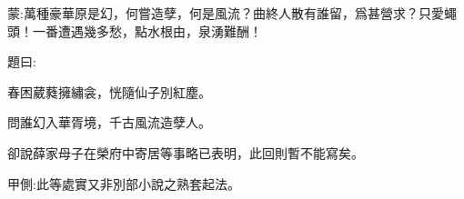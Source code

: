 


\begin{parag}
    \begin{note}蒙:萬種豪華原是幻，何嘗造孽，何是風流？曲終人散有誰留，爲甚營求？只愛蠅頭！一番遭遇幾多愁，點水根由，泉湧難酬！
    \end{note}
\end{parag}


\begin{parag}
    題曰:
\end{parag}


\begin{poem}
    \begin{pl}春困葳蕤擁繡衾，恍隨仙子別紅塵。\end{pl}

    \begin{pl}問誰幻入華胥境，千古風流造孽人。\end{pl}
\end{poem}


\begin{parag}
    卻說薛家母子在榮府中寄居等事略已表明，此回則暫不能寫矣。\begin{note}甲側:此等處實又非別部小說之熟套起法。\end{note}
\end{parag}



